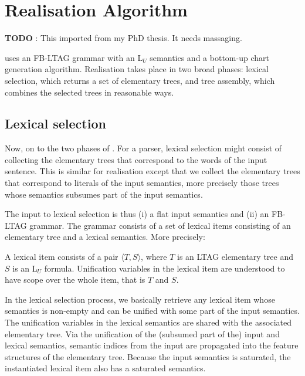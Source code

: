 %
\def\rulename#1#2{\multicolumn{1}{r#1}{\tiny (#2)}} %
\newcommand{\ellyou}{L$_U$\xspace}
\newcommand{\koweytautree}[1] {$\tau_{#1}$}
\newcommand{\koweynatlang}[1]{``#1''}
\newcommand{\koweytuple}[1]{\langle #1 \rangle}
\newcommand{\koweysemexpr}{\textit}

\chapter{Realisation Algorithm}
\label{cha:geni}

\textbf{TODO} : This imported from my PhD thesis.  It needs massaging.

\geni uses an FB-LTAG grammar with an \ellyou semantics and a bottom-up
chart generation algorithm.  Realisation takes place in two broad
phases: lexical selection, which returns a set of elementary trees, and
tree assembly, which combines the selected trees in reasonable ways.

\section{Lexical selection}
\label{sec:lexical-selection}

Now, on to the two phases of \geni.
For a parser, lexical selection might consist of collecting the
elementary trees that correspond to the words of the input sentence.
This is similar for realisation except that we collect the elementary
trees that correspond to literals of the input semantics, more precisely
those trees whose semantics subsumes part of the input semantics.

The input to lexical selection is thus (i) a flat input semantics and
(ii) an FB-LTAG grammar.  The grammar consists of a set of lexical items
consisting of an elementary tree and
a lexical semantics.  More precisely:
\begin{definition}\label{def:lexical-item}
A lexical item consists of a pair $\koweytuple{T,S}$, where $T$ is
an LTAG elementary tree and
$S$ is an \ellyou formula.  Unification variables in the lexical item
are understood to have scope over the whole item, that is $T$ and $S$.
\end{definition}

In the lexical selection process, we basically retrieve any lexical item
whose semantics is non-empty and can be unified with some part of the
input semantics.  The unification variables in the lexical semantics are
shared with the associated elementary tree.  Via the unification of the
(subsumed part of the) input and lexical semantics, semantic indices
from the input are propagated into the feature  structures of the
elementary tree.  Because the input semantics is saturated, the
instantiated lexical item also has a saturated semantics.


